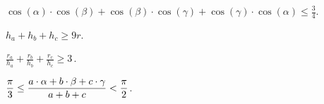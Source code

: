 \begin{problems}
\item
\(\displaystyle
    \cos(\alpha) \cdot \cos(\beta) +
    \cos(\beta) \cdot \cos(\gamma) +
    \cos(\gamma) \cdot \cos(\alpha)
\leq
    \frac{3}{4}
\)\;.

\item
\(\displaystyle
    h_a + h_b + h_c \geq 9 r
\).

\item
\(\displaystyle
    \frac{r_a}{h_a} + \frac{r_b}{h_b} + \frac{r_c}{h_c}
\geq
    3
\)\,.

\item
\(\displaystyle
    \frac{\mathrm{\pi}}{3}
\leq
    \frac{a \cdot \alpha + b \cdot \beta + c \cdot \gamma}{a + b + c}
<
    \frac{\mathrm{\pi}}{2}
\)\;.

\end{problems}

\endgroup %


